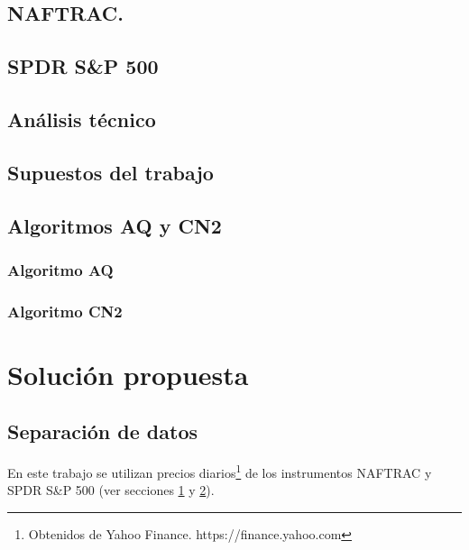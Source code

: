 \documentclass[onesided, 12pt]{scrbook}
\theoremstyle{break}
\begin{document}
\section{NAFTRAC.}
\label{seccion:naftrac}

\section{SPDR S\&P 500}
\label{seccion:sp500}

\section{Análisis técnico}
\label{seccion:analisisTecnico}

\section{Supuestos del trabajo}
\label{seccion:supuestos}


\section{Algoritmos AQ y CN2}
\label{seccion:algoritmos aq cn2}

\subsection{Algoritmo AQ}
\label{subseccion:algoritmo aq}

\subsection{Algoritmo CN2}
\label{subseccion:algoritmo cn2}

\chapter{Solución propuesta}
\label{capitulo:solucion propuesta}

\section{Separación de datos}
\label{seccion:separacion de datos}
En este trabajo se utilizan precios diarios\footnote{Obtenidos de Yahoo Finance. https://finance.yahoo.com} de los instrumentos NAFTRAC y SPDR S\&P 500 (ver secciones \ref{seccion:naftrac} y \ref{seccion:sp500}).
\end{document}
